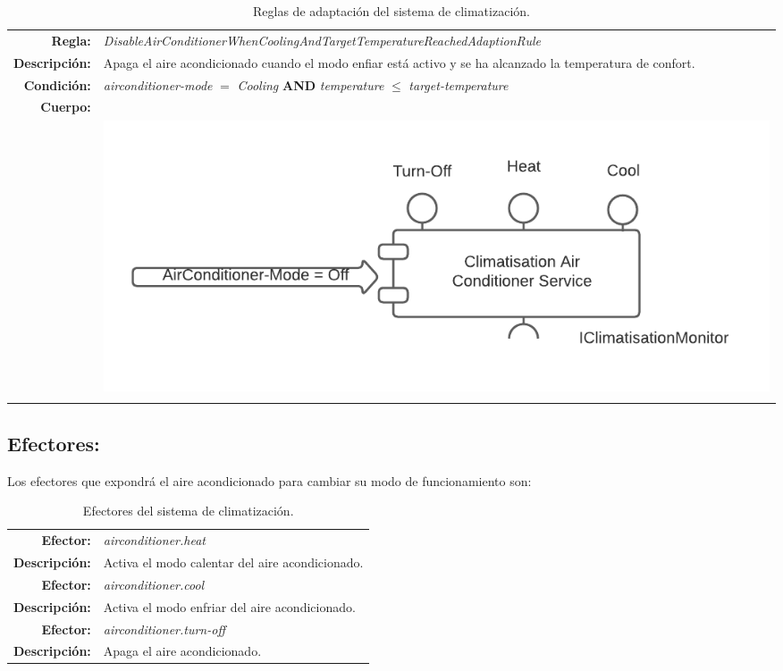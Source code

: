\begin{longtable}{|r p{12.8cm}|}
    \textbf{Regla:} & \emph{DisableAirConditionerWhenCoolingAndTargetTemperatureReachedAdaptionRule}  \\
    \textbf{Descripción:} & Apaga el aire acondicionado cuando el modo enfiar está activo y se ha alcanzado la temperatura de confort.  \\
    \textbf{Condición:} & \emph{airconditioner-mode} $=$  \emph{Cooling} \textbf{AND} \emph{temperature} $\le$ \emph{target-temperature}  \\
    \textbf{Cuerpo:} &  \\
    & \includegraphics[scale=0.75]{cap_caso-estudio/images/adaption-loop-rule-off} \\
    \hline

  \caption{Reglas de adaptación del sistema de climatización.}
  \label{tab:adaption-rules-climatisation}
\end{longtable}

\subsection{Efectores:}

Los efectores que expondrá el aire acondicionado para cambiar su modo de funcionamiento son:

\begin{table}[htb]
  \centering

  \begin{tabular}{|r p{11.5cm}|}
    \hline
    \textbf{Efector:} & \emph{airconditioner.heat}  \\
    \textbf{Descripción:} & Activa el modo calentar del aire acondicionado. \\
    \hline
    \textbf{Efector:} & \emph{airconditioner.cool}  \\
    \textbf{Descripción:} & Activa el modo enfriar del aire acondicionado. \\
    \hline
    \textbf{Efector:} & \emph{airconditioner.turn-off}  \\
    \textbf{Descripción:} & Apaga el aire acondicionado. \\
    \hline
  \end{tabular}

  \caption{Efectores del sistema de climatización.}
    \label{tab:climatisation-effectors}
\end{table}

